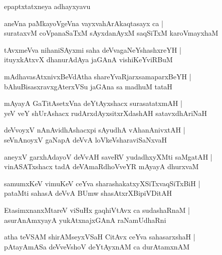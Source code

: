\documentclass[twoside,12pt,openright]{book}
\newcounter{shloka}[chapter]
\begin{document}
\begin{center}
epaptxtatxneya adhayxyavu
\end{center}

\begin{shloka}%
aneVna paMkayoVgeVna vayxvahArAkaqtasayx ca |\\
surataxvM coVpanaSaTxM sAyxdanAyxM saqSiTxM karoVmayxhaM 
\end{shloka}

\begin{shloka}%
tAvxmeVva nihaniSAyxmi saha deVvagaNeYshashxreYH |\\
ituyxkAtxvX dhanurAdAya jaGAnA vishiKeYviRBuM 
\end{shloka}

\begin{shloka}%
mAdhavasAtxnivxBeVdAtha shareYvaRjarxsamaparxBeYH |\\
bAhuBisasxravxgAterxVSu jaGAna sa madhuM tataH 
\end{shloka}

\begin{shloka}%
mAyayA GaTitAsetxVna deYtAyxshacx surasatatxmAH |\\
yeV veY shUrAshacx rudArxdAyxsitxrXdashAH satavxdhAriNaH 
\end{shloka}

\begin{shloka}%
deVvoyxV nAnAvidhAshacxpi sAyudhA vAhanAnivxtAH |\\
seVnAnoyxV gaNapA deVvA loVkeVsharaviSaNxvaH 
\end{shloka}

\begin{shloka}%
aneyxV garxhAdayoV deVvAH saveRV yudadhxyXMti saMgatAH |\\
vinASATxshacx tadA deVAmaRdhoVveYR mAyayA dhurxvaM 
\end{shloka}

\begin{shloka}%
samumxKeV vimuKeV ceYva sharashakatxyXSiTxvaqSiTxBiH |\\
pataMti sahasA deVvA BUmw shasAtxrXBipiVDitAH 
\end{shloka}

\begin{shloka}%
EtasimxnanxMtareV viSuHx gaqhiVtAvx ca sudashaRnaM |\\
asurAnAmxyayA yukAtxnajxGAnA raNamUdhaRni 
\end{shloka}

\begin{shloka}%
atha teVSAM shirAMseyxVSaH CitAvx ceYva sahasarxshaH |\\
pAtayAmASa deVveVshoV deYtAyxnAM ca durAtamxnAM 
\end{shloka}
\end{document}
